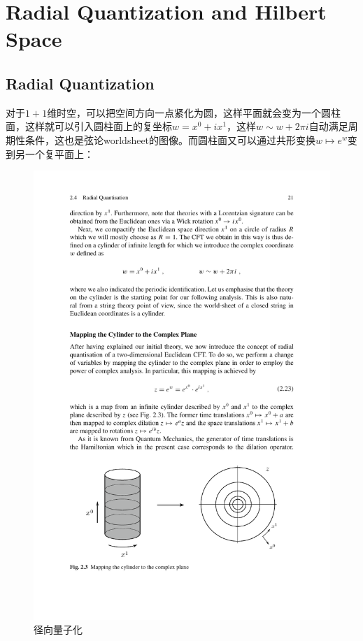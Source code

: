 \section{Radial Quantization and Hilbert Space}
\subsection{Radial Quantization}
对于$1+1$维时空，可以把空间方向一点紧化为圆，这样平面就会变为一个圆柱面，这样就可以引入圆柱面上的复坐标$w=x^0+ix^1$，这样$w\sim w+2\pi i$自动满足周期性条件，这也是弦论worldsheet的图像。而圆柱面又可以通过共形变换$w\mapsto e^w$变到另一个复平面上：
\begin{figure}[htbp]
	\centering
	\includegraphics{figs/fig9.pdf}
	\caption{径向量子化}
\end{figure}
